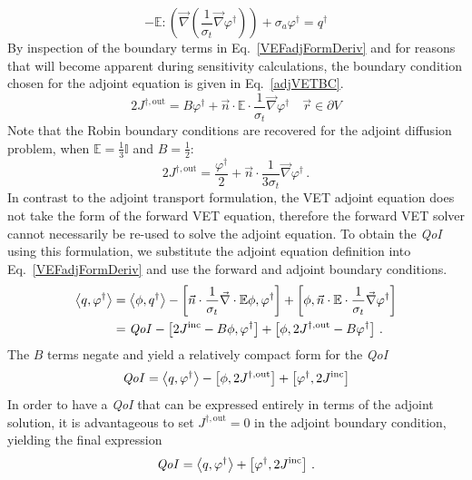 \documentclass[12pt]{report}
\newcommand{\vr}{\vec{r}}
\newcommand{\bra}{\left\langle}
\newcommand{\ket}{\right\rangle}
\newcommand{\sbra}{\left[}
\newcommand{\sket}{\right]}
\renewcommand{\div}{\vec{\nabla} \cdot}
\newcommand{\grad}{\vec{\nabla}}
\newcommand{\vefadj}{\varphi^\dag}
\newcommand{\bound}{\partial V}
\newcommand{\vn}{\vec{n}}
\newcommand{\Edd}{\mathbb{E}}
\newcommand{\sigt}{\sigma_t}
\newcommand{\siga}{\sigma_a}
\newcommand{\scalSource}{q}
\newcommand{\scalResp}{q^\dag}
\newcommand{\qoi}{{\it QoI}\xspace}
\begin{document}
\begin{equation}
\label{adjForm}
- \Edd : \left( \grad \left( \frac{1}{\sigt}\grad \vefadj \right) \right) + \siga \vefadj = \scalResp
\end{equation}
By inspection of the boundary terms in Eq.~\eqref{VEFadjFormDeriv} and for reasons that will become apparent during sensitivity calculations, the boundary condition chosen for the adjoint equation is given in Eq.~\eqref{adjVETBC}.
\begin{equation}
\label{adjVETBC}
2J^{\dag,\text{out}} = B \vefadj+ \vn \cdot
\Edd \cdot \frac{1}{\sigma_{t} } \vec{\nabla} \vefadj    \quad \vr \in \bound
\end{equation}
Note that the Robin boundary conditions are recovered for the adjoint diffusion problem, when $\Edd = \tfrac{1}{3} \mathbb{I}$ and $B=\tfrac{1}{2}$:
\[
2 J^{\dag,\text{out}} = \frac{\vefadj}{2} +\vn \cdot \frac{1}{3\sigt} \grad \vefadj \,.
\]
In contrast to the adjoint transport formulation, the VET adjoint equation does not take the form of the  
forward VET equation, therefore the forward VET solver 
cannot necessarily be re-used to solve the adjoint equation. 
To obtain the \qoi using this formulation, we substitute the adjoint equation definition 
into Eq.~\eqref{VEFadjFormDeriv} and use the forward and adjoint boundary conditions.
\begin{equation}
\label{VETQoIAdjUnpDeriv}
\begin{split}
 \bra \scalSource , \vefadj \ket 
&=   \bra \phi, \scalResp \ket - \sbra \vn \cdot \frac{1}{\sigt}\div \Edd \phi, \vefadj \sket + \sbra \phi, \vn \cdot \Edd \cdot \frac{1}{\sigt} \grad \vefadj \sket \\
&=   \qoi - \sbra 2J^{\text{inc}} - B \phi, \vefadj \sket + \sbra \phi, 2J^{\dag,\text{out}} - B \vefadj \sket \,.
\end{split}
\end{equation}
The $B$ terms negate and yield a relatively compact form for the \qoi
\begin{equation}
\label{VETQoIAdj}
\qoi=\bra \scalSource , \vefadj \ket 
- \sbra \phi, 2J^{\dag,\text{out}} \sket  + \sbra \varphi^\dag, 2J^{\text{inc}} \sket
\end{equation}
In order to have a \qoi that can be expressed entirely in terms of the adjoint solution, it is advantageous to 
set $J^{\dag,\text{out}}=0$ in the adjoint boundary condition, yielding the final expression
\begin{equation}
\qoi=\bra \scalSource , \vefadj \ket  + \sbra \vefadj, 2J^{\text{inc}} \sket \,.
\end{equation}
\end{document}
